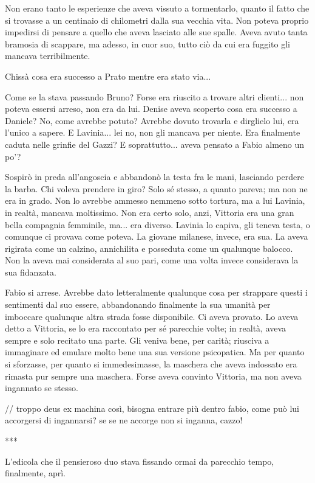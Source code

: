 Non erano tanto le esperienze che aveva vissuto a tormentarlo, quanto il fatto che si trovasse a un centinaio di chilometri dalla sua vecchia vita. Non poteva proprio impedirsi di pensare a quello che aveva lasciato alle sue spalle. Aveva avuto tanta bramosia di scappare, ma adesso, in cuor suo, tutto ciò da cui era fuggito gli mancava terribilmente.

Chissà cosa era successo a Prato mentre era stato via...

Come se la stava passando Bruno? Forse era riuscito a trovare altri clienti... non poteva essersi arreso, non era da lui. Denise aveva scoperto cosa era successo a Daniele? No, come avrebbe potuto? Avrebbe dovuto trovarla e dirglielo lui, era l'unico a sapere. E Lavinia... lei no, non gli mancava per niente. Era finalmente caduta nelle grinfie del Gazzi? E soprattutto... aveva pensato a Fabio almeno un po'?

Sospirò in preda all'angoscia e abbandonò la testa fra le mani, lasciando perdere la barba. Chi voleva prendere in giro? Solo sé stesso, a quanto pareva; ma non ne era in grado. Non lo avrebbe ammesso nemmeno sotto tortura, ma a lui Lavinia, in realtà, mancava moltissimo. Non era certo solo, anzi, Vittoria era una gran bella compagnia femminile, ma... era diverso. Lavinia lo capiva, gli teneva testa, o comunque ci provava come poteva. La giovane milanese, invece, era sua. La aveva rigirata come un calzino, annichilita e posseduta come un qualunque balocco. Non la aveva mai considerata al suo pari, come una volta invece considerava la sua fidanzata.

Fabio si arrese. Avrebbe dato letteralmente qualunque cosa per strappare questi i sentimenti dal suo essere, abbandonando finalmente la sua umanità per imboccare qualunque altra strada fosse disponibile. Ci aveva provato. Lo aveva detto a Vittoria, se lo era raccontato per sé parecchie volte; in realtà, aveva sempre e solo recitato una parte. Gli veniva bene, per carità; riusciva a immaginare ed emulare molto bene una sua versione psicopatica. Ma per quanto si sforzasse, per quanto si immedesimasse, la maschera che aveva indossato era rimasta pur sempre una maschera. Forse aveva convinto Vittoria, ma non aveva ingannato se stesso.

// troppo deus ex machina così, bisogna entrare più dentro fabio, come può lui accorgersi di ingannarsi? se se ne accorge non si inganna, cazzo!

***

L'edicola che il pensieroso duo stava fissando ormai da parecchio tempo, finalmente, aprì.

